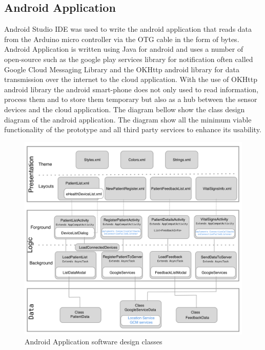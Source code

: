 \subsection{Android Application}


Android Studio IDE was used to write the android application that reads data from the Arduino micro controller via the OTG cable in the form of bytes. Android Application is written using Java for android and uses a number of open-source such as the google play services library for notification often called Google Cloud Messaging Library and the OKHttp android library for data transmission over the internet to the cloud application. With the use of OKHttp android library the android smart-phone does not only used to read information, process them and to store them temporary but also as a hub between the sensor devices and the cloud application. The diagram bellow show the class design diagram of the android application. The diagram show all the minimum viable functionality of the prototype and all third party services to enhance its usability.


\begin{figure}[H]
\centering
\includegraphics[width=13cm]{images/android_application_design.png} %
\caption{Android Application software design classes}
\label{fig:fig-eg}
\end{figure}


